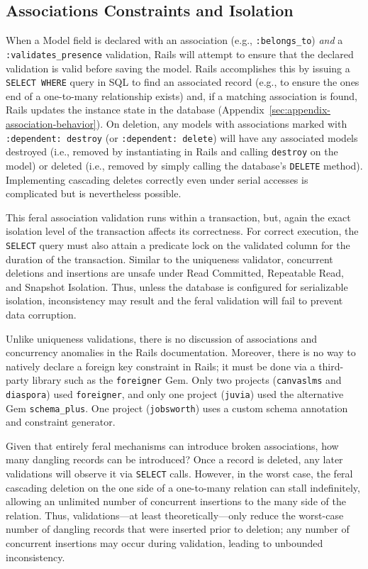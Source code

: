 \subsection{Associations Constraints and Isolation}

When a Model field is declared with an association (e.g.,
\texttt{:belongs\_to}) \textit{and} a \texttt{:validates\_presence}
validation, Rails will attempt to ensure that the declared validation
is valid before saving the model. Rails accomplishes this by issuing a
\texttt{SELECT WHERE} query in SQL to find an associated record (e.g.,
to ensure the ones end of a one-to-many relationship exists) and, if a
matching association is found, Rails updates the instance state in the
database (Appendix~\ref{sec:appendix-association-behavior}). On
deletion, any models with associations marked with \texttt{:dependent:
  destroy} (or \texttt{:dependent: delete}) will have any associated
models destroyed (i.e., removed by instantiating in Rails and calling
\texttt{destroy} on the model) or deleted (i.e., removed by simply
calling the database's \texttt{DELETE} method). Implementing cascading
deletes correctly even under serial accesses is complicated but is
nevertheless possible.

This feral association validation runs within a transaction, but,
again the exact isolation level of the transaction affects its
correctness. For correct execution, the \texttt{SELECT} query must
also attain a predicate lock on the validated column for the duration
of the transaction. Similar to the uniqueness validator, concurrent
deletions and insertions are unsafe under Read Committed, Repeatable
Read, and Snapshot Isolation. Thus, unless the database is configured
for serializable isolation, inconsistency may result and the feral
validation will fail to prevent data corruption.

Unlike uniqueness validations, there is no discussion of associations
and concurrency anomalies in the Rails documentation. Moreover, there
is no way to natively declare a foreign key constraint in Rails; it
must be done via a third-party library such as the \texttt{foreigner}
Gem. Only two projects (\texttt{canvaslms} and \texttt{diaspora}) used
\texttt{foreigner}, and only one project (\texttt{juvia}) used the
alternative Gem \texttt{schema\_plus}. One project
(\texttt{jobsworth}) uses a custom schema annotation and constraint
generator.

 Given that entirely
feral mechanisms can introduce broken associations, how many dangling
records can be introduced? Once a record is deleted, any later
validations will observe it via \texttt{SELECT} calls. However, in the
worst case, the feral cascading deletion on the one side of a
one-to-many relation can stall indefinitely, allowing an unlimited
number of concurrent insertions to the many side of the
relation. Thus, validations---at least theoretically---only reduce the
worst-case number of dangling records that were inserted prior to
deletion; any number of concurrent insertions may occur during
validation, leading to unbounded inconsistency.

